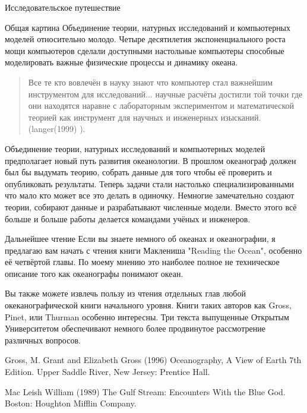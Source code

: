 \begin{chapter}{Исследовательское путешествие}
\begin{section}{Общая картина}
Объединение теории, натурных исследований и компьютерных моделей относительно 
молодо. Четыре десятилетия экспоненциального роста мощи компьютеров 
сделали доступными настольные компьютеры способные моделировать важные 
физические процессы и динамику океана.

\begin{quotation}
Все те кто вовлечён в науку знают что компьютер стал важнейшим инструментом 
для исследований... научные расчёты достигли той точки где они находятся 
наравне с лабораторным экспериментом и математической теорией как 
инструмент для научных и инженерных изысканий. (langer(1999) ).
\end{quotation}



Объединение теории, натурных исследований и компьютерных моделей предполагает 
новый путь развития океанологии. В прошлом океанограф должен был бы выдумать 
теорию, собрать данные для того чтобы её проверить и опубликовать результаты. 
Теперь задачи стали настолько специализированными что мало кто может все 
это делать в одиночку. Немногие замечательно создают теории, собирают 
данные и разрабатывают численные модели. Вместо этого всё больше и больше 
работы делается командами учёных и инженеров.
\end{section}

\begin{section}{Дальнейшее чтение}
Если вы знаете немного об океанах и океанографии, я предлагаю вам начать 
с чтения книги Маклениша "Reading the Ocean", особенно её четвёртой главы. 
По моему мнению это наиболее полное не техническое описание того как 
океанографы понимают океан.

Вы также можете извлечь пользу из чтения отдельных глав любой 
океканографической книги начального уровня. Книги таких авторов как 
Gross, Pinet, или Thurman особенно интересны. Три текста выпущенные 
Открытым Университетом обеспечивают немного более продвинутое рассмотрение 
различных вопросов. 

Gross, M. Grant and Elizabeth Gross (1996) Oceanography, 
A View of Earth 7th Edition. Upper Saddle River, New Jersey: Prentice Hall. 

Mac Leish William (1989) The Gulf Stream: Encounters With the Blue God. 
Boston: Houghton Mifflin Company. 


\end{section}
\end{chapter}
